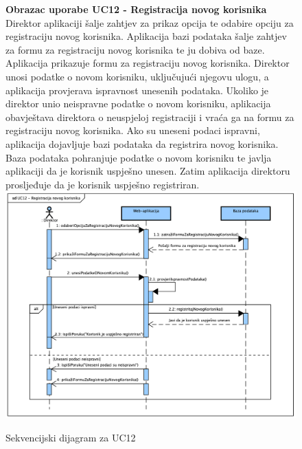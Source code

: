 				\begin{figure}[H]
					\textbf{Obrazac uporabe UC12 - Registracija novog korisnika}
					\newline
					Direktor aplikaciji šalje zahtjev za prikaz opcija te odabire opciju za registraciju novog korisnika. Aplikacija bazi podataka šalje zahtjev za formu za registraciju novog korisnika te ju dobiva od baze. Aplikacija prikazuje
					formu za registraciju novog korisnika. Direktor unosi podatke o novom korisniku, uključujući njegovu ulogu, a aplikacija provjerava ispravnost unesenih podataka. Ukoliko je direktor unio neispravne podatke o novom korisniku,
					aplikacija obavještava direktora o neuspjeloj registraciji i vraća ga na formu za registraciju novog korisnika. Ako su uneseni podaci ispravni, aplikacija dojavljuje bazi podataka da registrira novog korisnika. Baza podataka
					pohranjuje podatke o novom korisniku te javlja aplikaciji da je korisnik uspješno unesen. Zatim aplikacija direktoru prosljeđuje da je korisnik uspješno registriran.
					\newline
					\includegraphics[width=\textwidth]{slike/Sequence_UC12.png}
					\caption{Sekvencijski dijagram za UC12}
					\label{fig:sequence_UC12}
				\end{figure}

